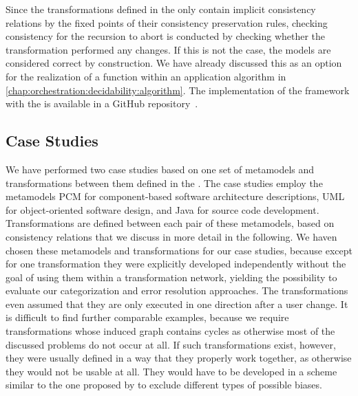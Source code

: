 Since the transformations defined in the \reactionslanguage only contain implicit consistency relations by the fixed points of their consistency preservation rules, checking consistency for the recursion to abort is conducted by checking whether the transformation performed any changes.
If this is not the case, the models are considered correct by construction.
We have already discussed this as an option for the realization of a  function within an application algorithm in \autoref{chap:orchestration:decidability:algorithm}.
The implementation of the framework with the \reactionslanguage is available in a GitHub repository~\cite{vitruvFrameworkGithub}.






\subsection{Case Studies}

We have performed two case studies based on one set of metamodels and transformations between them defined in the \reactionslanguage.
The case studies employ the metamodels \gls{PCM} for component-based software architecture descriptions, \gls{UML} for object-oriented software design, and Java for source code development.
Transformations are defined between each pair of these metamodels, based on consistency relations that we discuss in more detail in the following.
We haven chosen these metamodels and transformations for our case studies, because except for one transformation they were explicitly developed independently without the goal of using them within a transformation network, yielding the possibility to evaluate our categorization and error resolution approaches.
The transformations even assumed that they are only executed in one direction after a user change.
It is difficult to find further comparable examples, because we require transformations whose induced graph contains cycles as otherwise most of the discussed problems do not occur at all.
If such transformations exist, however, they were usually defined in a way that they properly work together, as otherwise they would not be usable at all.
They would have to be developed in a scheme similar to the one proposed by \textcite{kramer2016c} to exclude different types of possible biases.

